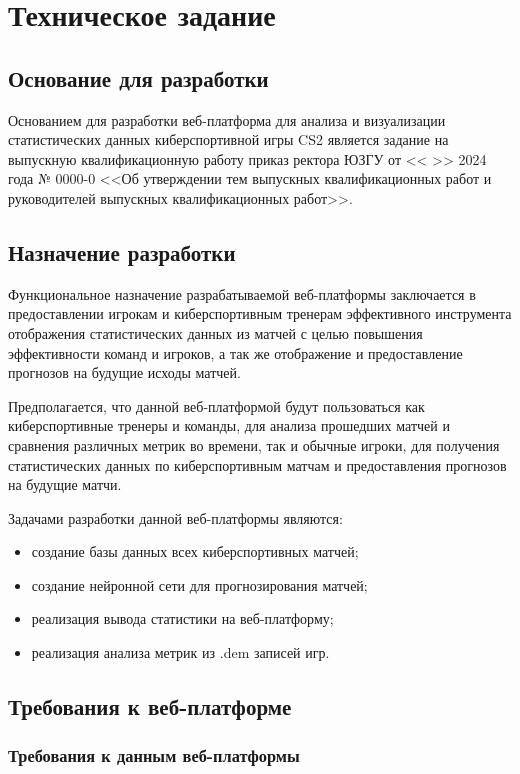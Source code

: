 \newsection
\section{Техническое задание}
\subsection{Основание для разработки}

Основанием для разработки веб-платформа для анализа и визуализации статистических данных киберспортивной игры CS2 является задание на выпускную квалификационную работу приказ ректора ЮЗГУ от <<  >>     2024 года № 0000-0 <<Об утверждении тем выпускных квалификационных работ и руководителей выпускных квалификационных работ>>.

\subsection{Назначение разработки}

Функциональное назначение разрабатываемой веб-платформы заключается в предоставлении игрокам и киберспортивным тренерам эффективного инструмента отображения статистических данных из матчей с целью повышения эффективности команд и игроков, а так же отображение и предоставление прогнозов на будущие исходы матчей.

Предполагается, что данной веб-платформой будут пользоваться как киберспортивные тренеры и команды, для анализа прошедших матчей и сравнения различных метрик во времени, так и обычные игроки, для получения статистических данных по киберспортивным матчам и предоставления прогнозов на будущие матчи.

Задачами разработки данной веб-платформы являются:
\begin{itemize}
	\item создание базы данных всех киберспортивных матчей;
	\item создание нейронной сети для прогнозирования матчей;
	\item реализация вывода статистики на веб-платформу;
	\item реализация анализа метрик из .dem записей игр.
\end{itemize}

\subsection{Требования к веб-платформе}
\subsubsection{Требования к данным веб-платформы}

